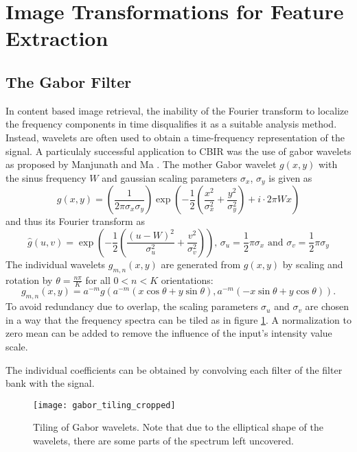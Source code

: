 \section{Image Transformations for Feature Extraction}

\subsection{The Gabor Filter}

In content based image retrieval, the inability of the Fourier transform to
localize the frequency components in time disqualifies it as a suitable
analysis method. Instead, wavelets are often used to obtain a time-frequency
representation of the signal. A particulaly successful application to CBIR was
the use of gabor wavelets as proposed by Manjunath and Ma
\autocite{manjunath_texture_1996}. The mother Gabor wavelet $g(x, y)$ with the
sinus frequency $W$ and gaussian scaling parameters $\sigma_x$, $\sigma_y$ is
given as
\begin{equation*}
    g(x, y) = \left( \frac{1}{2 \pi \sigma_x \sigma_y} \right) \exp{\left( - \frac{1}{2} \left( \frac{x^2}{\sigma_x^2} + \frac{y^2}{\sigma_y^2} \right) + i \cdot 2 \pi W x \right)}
\end{equation*}
and thus its Fourier transform as
\begin{equation*}
    \hat{g}(u, v) = \exp{\left( - \frac{1}{2} \left( \frac{(u - W)^2}{\sigma_u^2} + \frac{v^2}{\sigma_v^2} \right) \right)}\text{, }
    \sigma_u = \frac{1}{2} \pi \sigma_x \text{ and } \sigma_v = \frac{1}{2} \pi \sigma_y
\end{equation*}
The individual wavelets $g_{m, n}(x, y)$ are generated from $g(x, y)$ by
scaling and rotation by $\theta = \frac{n \pi}{K}$ for all $0 < n < K$
orientations:
\begin{equation*}
    g_{m, n}(x, y) = a^{-m} g \left( a^{-m} (x \cos{\theta} + y \sin{\theta}), a^{-m} (-x \sin{\theta} + y \cos{\theta}) \right).
\end{equation*}
To avoid redundancy due to overlap, the scaling parameters $\sigma_u$ and
$\sigma_v$ are chosen in a way that the frequency spectra can be tiled as in
figure \ref{fig:gabor_tiling}. A normalization to zero mean can be added to
remove the influence of the input's intensity value scale.

The individual coefficients can be obtained by convolving each filter of the
filter bank with the signal.

\begin{figure}[h]
    \centering
        \texttt{[image: gabor\_tiling\_cropped]}
    \caption[Tiling of Gabor wavelets]{
        Tiling of Gabor wavelets. Note that due to the elliptical shape of the
        wavelets, there are some parts of the spectrum left uncovered.
        }
    \label{fig:gabor_tiling}
\end{figure}

